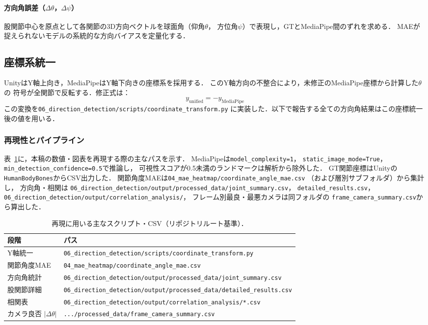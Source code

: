 \documentclass[twocolumn]{article}
\begin{document}
\paragraph{方向角誤差（$\Delta\theta$，$\Delta\psi$）}
股関節中心を原点として各関節の3D方向ベクトルを球面角（仰角$\theta$，
方位角$\psi$）で表現し，GTとMediaPipe間のずれを求める．
MAEが捉えられないモデルの系統的な方向バイアスを定量化する．

\subsection{座標系統一}

UnityはY軸上向き，MediaPipeはY軸下向きの座標系を採用する．
このY軸方向の不整合により，未修正のMediaPipe座標から計算した$\theta$の
符号が全関節で反転する．修正式は：
\[
  y_{\text{unified}} = -y_{\text{MediaPipe}}
\]
この変換を\texttt{06\_direction\_detection/scripts/coordinate\_transform.py}
に実装した．以下で報告する全ての方向角結果はこの座標統一後の値を用いる．

\subsubsection{再現性とパイプライン}

表~\ref{tab:repro_pipeline}に，本稿の数値・図表を再現する際の主なパスを示す．
MediaPipeは\texttt{model\_complexity=1}，
\texttt{static\_image\_mode=True}，
\texttt{min\_detection\_confidence=0.5}で推論し，
可視性スコアが0.5未満のランドマークは解析から除外した．
GT関節座標はUnityの\texttt{HumanBodyBones}からCSV出力した．
関節角度MAEは\texttt{04\_mae\_heatmap/coordinate\_angle\_mae.csv}
（および層別サブフォルダ）から集計し，
方向角・相関は
\texttt{06\_direction\_detection/output/processed\_data/joint\_summary.csv}，
\texttt{detailed\_results.csv}，
\texttt{06\_direction\_detection/output/correlation\_analysis/}，
フレーム別最良・最悪カメラは同フォルダの
\texttt{frame\_camera\_summary.csv}から算出した．

\begin{table}[!t]
\centering
\caption{再現に用いる主なスクリプト・CSV（リポジトリルート基準）．}
\label{tab:repro_pipeline}
\footnotesize
\begin{tabular}{ll}
\toprule
段階 & パス \\
\midrule
Y軸統一 & \texttt{06\_direction\_detection/scripts/coordinate\_transform.py} \\
関節角度MAE & \texttt{04\_mae\_heatmap/coordinate\_angle\_mae.csv} \\
方向角統計 & \texttt{06\_direction\_detection/output/processed\_data/joint\_summary.csv} \\
股関節詳細 & \texttt{06\_direction\_detection/output/processed\_data/detailed\_results.csv} \\
相関表 & \texttt{06\_direction\_detection/output/correlation\_analysis/*.csv} \\
カメラ良否 $|\Delta\theta|$ & \texttt{.../processed\_data/frame\_camera\_summary.csv} \\
\bottomrule
\end{tabular}
\end{table}
\end{document}
